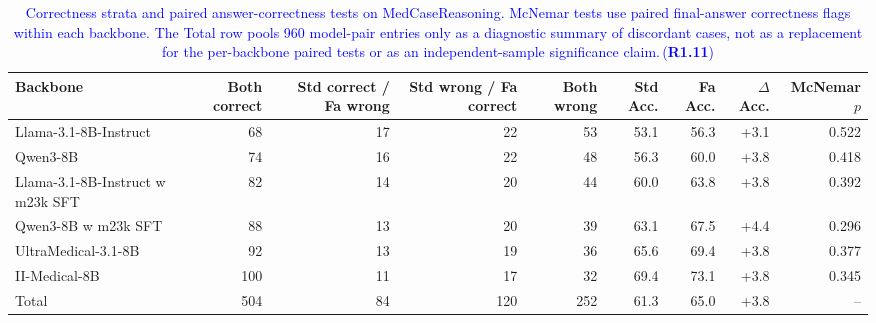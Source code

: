 \documentclass[a4paper,fleqn,doubleblind]{cas-sc}
\DeclareRobustCommand{\added}[1]{\textcolor{blue}{#1}}
\DeclareRobustCommand{\revtag}[1]{\textcolor{blue}{\scriptsize\,(\textbf{#1})}}
\begin{document}
\begin{table}[htbp]
    \centering
    \scriptsize
    \setlength{\tabcolsep}{3.5pt}
    \caption{\added{Correctness strata and paired answer-correctness tests on MedCaseReasoning. McNemar tests use paired final-answer correctness flags within each backbone. The Total row pools 960 model-pair entries only as a diagnostic summary of discordant cases, not as a replacement for the per-backbone paired tests or as an independent-sample significance claim.}\revtag{R1.11}}
    \label{tab:correctness_strata_counts}
    \begin{adjustbox}{max width=\textwidth}
    \begingroup\color{blue}
    \begin{tabular}{lrrrrrrrr}
        \toprule
        \textbf{Backbone} & \textbf{Both correct} & \textbf{Std correct / Fa wrong} & \textbf{Std wrong / Fa correct} & \textbf{Both wrong} & \textbf{Std Acc.} & \textbf{Fa Acc.} & \textbf{$\Delta$ Acc.} & \textbf{McNemar $p$} \\
        \midrule
        Llama-3.1-8B-Instruct & 68 & 17 & 22 & 53 & 53.1 & 56.3 & +3.1 & 0.522 \\
        Qwen3-8B & 74 & 16 & 22 & 48 & 56.3 & 60.0 & +3.8 & 0.418 \\
        Llama-3.1-8B-Instruct w m23k SFT & 82 & 14 & 20 & 44 & 60.0 & 63.8 & +3.8 & 0.392 \\
        Qwen3-8B w m23k SFT & 88 & 13 & 20 & 39 & 63.1 & 67.5 & +4.4 & 0.296 \\
        UltraMedical-3.1-8B & 92 & 13 & 19 & 36 & 65.6 & 69.4 & +3.8 & 0.377 \\
        II-Medical-8B & 100 & 11 & 17 & 32 & 69.4 & 73.1 & +3.8 & 0.345 \\
        \midrule
        Total & 504 & 84 & 120 & 252 & 61.3 & 65.0 & +3.8 & -- \\
        \bottomrule
    \end{tabular}
    \endgroup
    \end{adjustbox}
\end{table}
\end{document}
